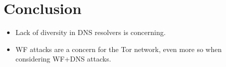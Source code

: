 \section{Conclusion}
\label{sec:conclusion}
\begin{itemize}
	\item Lack of diversity in DNS resolvers is concerning.
	\item WF attacks are a concern for the Tor network, even more so when
	considering WF+DNS attacks. 
\end{itemize}
